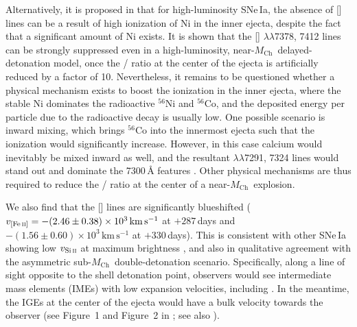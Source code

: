 \documentclass[twocolumn]{aastex631}
\newcommand{\Mch}{$M_\mathrm{Ch}$}
\begin{document}
\begin{CJK*}{UTF8}{gbsn}
Alternatively, it is proposed in \citet{Blondin_2022} that for high-luminosity SNe\,Ia, the absence of [] lines can be a result of high ionization of Ni in the inner ejecta, despite the fact that a significant amount of Ni exists. It is shown that the [] $\lambda\lambda$7378, 7412 lines can be strongly suppressed even in a high-luminosity, near-\Mch\ delayed-detonation model, once the / ratio at the center of the ejecta is artificially reduced by a factor of 10. Nevertheless, it remains to be questioned whether a physical mechanism exists to boost the ionization in the inner ejecta, where the stable Ni dominates the radioactive $^{56}$Ni and $^{56}$Co, and the deposited energy per particle due to the radioactive decay is usually low. One possible scenario is inward mixing, which brings $^{56}$Co into the innermost ejecta such that the ionization would significantly increase. However, in this case calcium would inevitably be mixed inward as well, and the resultant  $\lambda\lambda$7291, 7324 lines would stand out and dominate the 7300\,\r{A} features \citep{Blondin_2022}. Other physical mechanisms are thus required to reduce the / ratio at the center of a near-\Mch\ explosion.

We also find that the [] lines are significantly blueshifted ($v_\mathrm{[Fe\,\textsc{ii}]}=-(2.46\pm0.38)\times10^3\mathrm{\,km\,s^{-1}}$ at $+287$\,days and $-(1.56\pm0.60)\times10^3\mathrm{\,km\,s^{-1}}$ at $+330$\,days). This is consistent with other SNe\,Ia showing low $v_\mathrm{Si\,\textsc{ii}}$ at maximum brightness \citep{Maeda_2010,Maguire_2018,Li_2021}, and also in qualitative agreement with the asymmetric sub-\Mch\ double-detonation scenario. Specifically, along a line of sight opposite to the shell detonation point, observers would see intermediate mass elements (IMEs) with low expansion velocities, including . In the meantime, the IGEs at the center of the ejecta would have a bulk velocity towards the observer (see Figure~1 and Figure~2 in \citealp{Bulla_2016}; see also \citealp{Fink_DD_2010}).




\end{CJK*}
\end{document}
